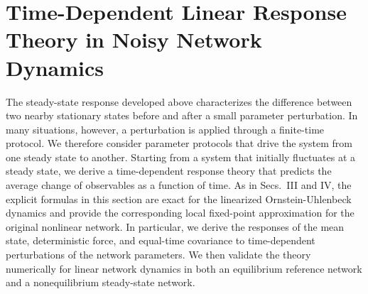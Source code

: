 \section{Time-Dependent Linear Response Theory in Noisy Network Dynamics}\label{sec:time-dependent}
\quad The steady-state response developed above characterizes the difference between two nearby stationary states before and after a small parameter perturbation. In many situations, however, a perturbation is applied through a finite-time protocol. We therefore consider parameter protocols that drive the system from one steady state to another. Starting from a system that initially fluctuates at a steady state, we derive a time-dependent response theory that predicts the average change of observables as a function of time. As in Secs.~III and IV, the explicit formulas in this section are exact for the linearized Ornstein-Uhlenbeck dynamics and provide the corresponding local fixed-point approximation for the original nonlinear network. In particular, we derive the responses of the mean state, deterministic force, and equal-time covariance to time-dependent perturbations of the network parameters. We then validate the theory numerically for linear network dynamics in both an equilibrium reference network and a nonequilibrium steady-state network.

